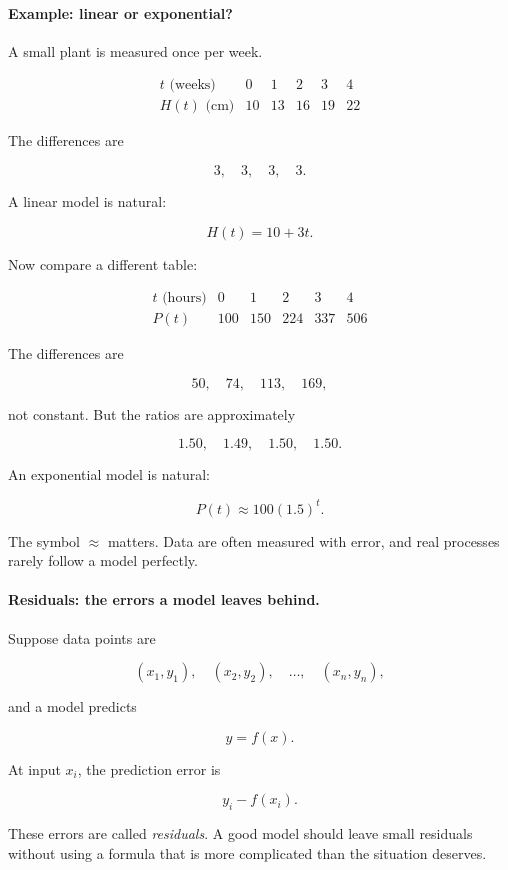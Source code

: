 \paragraph{Example: linear or exponential?}
A small plant is measured once per week.

\[
\begin{array}{c|ccccc}
t\text{ (weeks)} & 0 & 1 & 2 & 3 & 4 \\ \hline
H(t)\text{ (cm)} & 10 & 13 & 16 & 19 & 22
\end{array}
\]

The differences are

\[
3,\quad 3,\quad 3,\quad 3.
\]

A linear model is natural:

\[
H(t)=10+3t.
\]

Now compare a different table:

\[
\begin{array}{c|ccccc}
t\text{ (hours)} & 0 & 1 & 2 & 3 & 4 \\ \hline
P(t) & 100 & 150 & 224 & 337 & 506
\end{array}
\]

The differences are

\[
50,\quad 74,\quad 113,\quad 169,
\]

not constant. But the ratios are approximately

\[
1.50,\quad 1.49,\quad 1.50,\quad 1.50.
\]

An exponential model is natural:

\[
P(t)\approx 100(1.5)^t.
\]

The symbol \(\approx\) matters. Data are often measured with error, and real processes rarely follow a model perfectly.

\paragraph{Residuals: the errors a model leaves behind.}
Suppose data points are

\[
(x_1,y_1),\quad (x_2,y_2),\quad \ldots,\quad (x_n,y_n),
\]

and a model predicts

\[
y=f(x).
\]

At input \(x_i\), the prediction error is

\[
y_i-f(x_i).
\]

These errors are called \emph{residuals}. A good model should leave small residuals without using a formula that is more complicated than the situation deserves.

